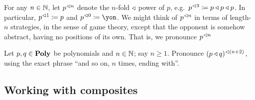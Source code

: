 \documentclass[DynamicalBook]{subfiles}
\begin{document}
For any $n\in\mathbb{N}$, let $p^{\lhd n}$ denote the $n$-fold $\mathbin{\triangleleft}$ power of $p$, e.g.\ $p^{\lhd 3}\coloneqq p\mathbin{\triangleleft} p\mathbin{\triangleleft} p$. In particular, $p^{\lhd 1}\coloneqq p$ and $p\tripow{0}\coloneqq\yon$. We might think of $p^{\lhd n}$ in terms of length-$n$ strategies, in the sense of game theory, except that the opponent is somehow abstract, having no positions of its own. That is, we pronounce $p^{\lhd n}$

\begin{exercise}
Let $p,q\in\textbf{Poly}$ be polynomials and $n\in\mathbb{N}$; say $n\geq 1$. Pronounce $(p\mathbin{\triangleleft} q)^{\lhd (n+2)}$, using the exact phrase ``and so on, $n$ times, ending with''.
\end{exercise}


\subsection{Working with composites}\label{subsec.working_with_composites}
\end{document}
